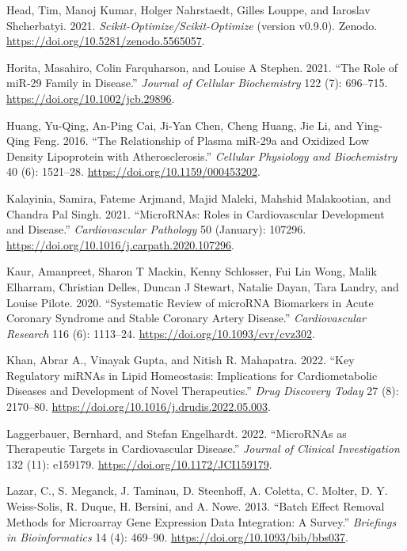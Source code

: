 \documentclass[smallextended]{svjour3}       %
\newlength{\cslhangindent}
\newlength{\cslentryspacingunit} %
\newenvironment{CSLReferences}[2] %
 {%
  \setlength{\parindent}{0pt}
  \ifodd #1
  \let\oldpar\par
  \def\par{\hangindent=\cslhangindent\oldpar}
  \fi
  \setlength{\parskip}{#2\cslentryspacingunit}
 }%
 {}
\begin{document}
\begin{CSLReferences}{1}{0}
\leavevmode{}%
Head, Tim, Manoj Kumar, Holger Nahrstaedt, Gilles Louppe, and Iaroslav
Shcherbatyi. 2021. \emph{Scikit-Optimize/Scikit-Optimize} (version
v0.9.0). Zenodo. \url{https://doi.org/10.5281/zenodo.5565057}.

\leavevmode{}%
Horita, Masahiro, Colin Farquharson, and Louise A Stephen. 2021. {``The
Role of {miR}‐29 Family in Disease.''} \emph{Journal of Cellular
Biochemistry} 122 (7): 696--715.
\url{https://doi.org/10.1002/jcb.29896}.

\leavevmode{}%
Huang, Yu-Qing, An-Ping Cai, Ji-Yan Chen, Cheng Huang, Jie Li, and
Ying-Qing Feng. 2016. {``The {Relationship} of {Plasma} {miR}-29a and
{Oxidized} {Low} {Density} {Lipoprotein} with {Atherosclerosis}.''}
\emph{Cellular Physiology and Biochemistry} 40 (6): 1521--28.
\url{https://doi.org/10.1159/000453202}.

\leavevmode{}%
Kalayinia, Samira, Fateme Arjmand, Majid Maleki, Mahshid Malakootian,
and Chandra Pal Singh. 2021. {``{MicroRNAs}: Roles in Cardiovascular
Development and Disease.''} \emph{Cardiovascular Pathology} 50
(January): 107296. \url{https://doi.org/10.1016/j.carpath.2020.107296}.

\leavevmode{}%
Kaur, Amanpreet, Sharon T Mackin, Kenny Schlosser, Fui Lin Wong, Malik
Elharram, Christian Delles, Duncan J Stewart, Natalie Dayan, Tara
Landry, and Louise Pilote. 2020. {``Systematic Review of {microRNA}
Biomarkers in Acute Coronary Syndrome and Stable Coronary Artery
Disease.''} \emph{Cardiovascular Research} 116 (6): 1113--24.
\url{https://doi.org/10.1093/cvr/cvz302}.

\leavevmode{}%
Khan, Abrar A., Vinayak Gupta, and Nitish R. Mahapatra. 2022. {``Key
Regulatory {miRNAs} in Lipid Homeostasis: {Implications} for
Cardiometabolic Diseases and Development of Novel Therapeutics.''}
\emph{Drug Discovery Today} 27 (8): 2170--80.
\url{https://doi.org/10.1016/j.drudis.2022.05.003}.

\leavevmode{}%
Laggerbauer, Bernhard, and Stefan Engelhardt. 2022. {``{MicroRNAs} as
Therapeutic Targets in Cardiovascular Disease.''} \emph{Journal of
Clinical Investigation} 132 (11): e159179.
\url{https://doi.org/10.1172/JCI159179}.

\leavevmode{}%
Lazar, C., S. Meganck, J. Taminau, D. Steenhoff, A. Coletta, C. Molter,
D. Y. Weiss-Solis, R. Duque, H. Bersini, and A. Nowe. 2013. {``Batch
Effect Removal Methods for Microarray Gene Expression Data Integration:
A Survey.''} \emph{Briefings in Bioinformatics} 14 (4): 469--90.
\url{https://doi.org/10.1093/bib/bbs037}.


\end{CSLReferences}
\end{document}
